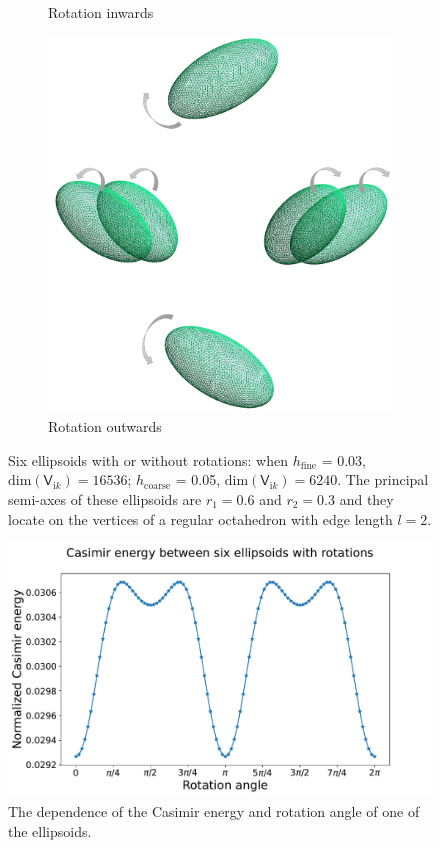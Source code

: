 \begin{figure}[H]
\begin{subfigure}{.5\linewidth}
    \caption{Rotation inwards}
    \label{Rotation inwards 6}
    \end{subfigure}%
    \begin{subfigure}{.5\linewidth}
    \centering
    \includegraphics[scale = 0.4]{figures/6_ellip_out}
    \caption{Rotation outwards}
    \label{Rotation outwards 6}
    \end{subfigure}
    \caption{Six ellipsoids with or without rotations: when $h_\text{fine}$ = 0.03, $\text{dim}(\mathsf{V}_{\mathrm{i}k}) = 16536$;  $h_\text{coarse}$ = 0.05, $\text{dim}(\mathsf{V}_{\mathrm{i}k}) = 6240$.
    The principal semi-axes of these ellipsoids are $r_{1} = 0.6$ and $r_{2} = 0.3$
    and they locate on the vertices of a regular octahedron with edge length $l = 2$.}
    \label{Six ellipsoids with or without rotations}
    \end{figure}

    \begin{figure}[H]
        \centering
        \includegraphics[scale = 0.5]{figures/CasE_6_ellip.pdf}
        \caption{The dependence of the Casimir energy and rotation angle of one of the ellipsoids.}
        \label{Six ellipsoids}
    \end{figure}